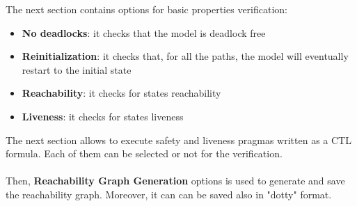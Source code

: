 \documentclass[12pt]{article}
\begin{document}
The next section contains options for basic properties verification:
\begin{itemize}
	\item \textbf{No deadlocks}: it checks that the model is deadlock free
	\item \textbf{Reinitialization}: it checks that, for all the paths, the model will eventually restart to the initial state
	\item \textbf{Reachability}: it checks for states reachability
	\item \textbf{Liveness}: it checks for states liveness
\end{itemize}
The next section allows to execute safety and liveness pragmas written as a CTL formula. Each of them can be selected or not for the verification.
\\\\
Then, \textbf{Reachability Graph Generation} options is used to generate and save the reachability graph. Moreover, it can can be saved also in "dotty" format.
\end{document}
